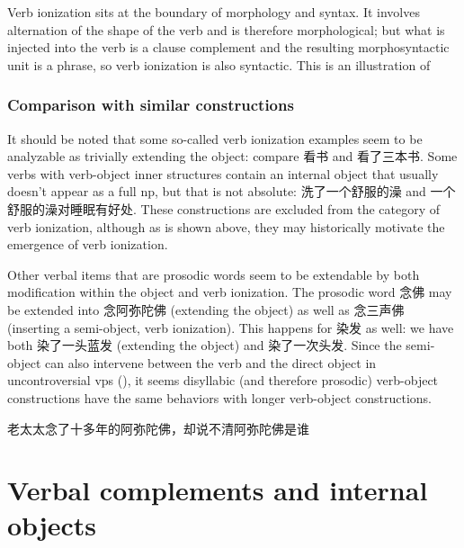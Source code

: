 \documentclass[UTF8, a4paper, oneside, scheme=plain, 12pt]{ctexrep}
\begin{document}
Verb ionization sits at the boundary of morphology and syntax.
It involves alternation of the shape of the verb 
and is therefore morphological; 
but what is injected into the verb is a clause complement  
and the resulting morphosyntactic unit is a phrase,
so verb ionization is also syntactic. 
This is an illustration of 

\subsubsection{Comparison with similar constructions}\label{sec:verb-phrase.ionization.similar}

It should be noted that some so-called verb ionization examples 
seem to be analyzable as 
trivially extending the object: 
compare 看书 and 看了三本书.
Some verbs with verb-object inner structures 
contain an internal object that usually doesn't appear as a full \acs{np}, 
but that is not absolute: 
洗了一个舒服的澡 and 一个舒服的澡对睡眠有好处.
These constructions are excluded from the category of verb ionization,
although as is shown above, 
they may historically motivate the emergence of verb ionization.

Other verbal items that are prosodic words
seem to be extendable by 
both modification within the object 
and verb ionization.
The prosodic word 念佛 may be extended into 念阿弥陀佛 (extending the object)
as well as 念三声佛 (inserting a semi-object, verb ionization).
This happens for 染发 as well: 
we have both 染了一头蓝发 (extending the object) 
and 染了一次头发.
Since the semi-object can also intervene
between the verb and the direct object in uncontroversial \acs{vp}s 
(), 
it seems disyllabic (and therefore prosodic) verb-object constructions 
have the same behaviors with 
longer verb-object constructions.

\begin{exe}
    \ex\label{ex:verb-phrase.separation.nianfo-full-vp} 老太太念了十多年的阿弥陀佛，却说不清阿弥陀佛是谁
\end{exe}

\section{Verbal complements and internal objects}\label{sec:verbal-complement}
\end{document}
